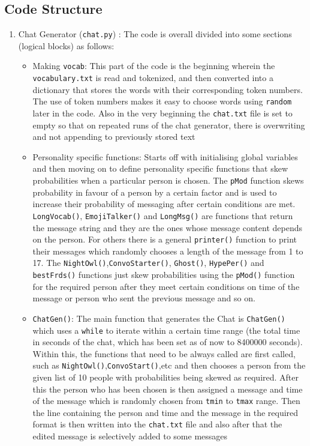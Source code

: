 \documentclass[12pt]{extarticle}
\begin{document}

\subsection{Code Structure}
\begin{enumerate}
    \item Chat Generator (\texttt{chat.py}) \cite{site1}: The code is overall divided into some sections (logical blocks) as follows:
    \begin{itemize}
        \item Making \texttt{vocab}: This part of the code is the beginning wherein the \texttt{vocabulary.txt} is read and tokenized, and then converted into a dictionary that stores the words with their corresponding token numbers. The use of token numbers makes it easy to choose words using \texttt{random} later in the code. Also in the very beginning the \texttt{chat.txt} file is set to empty so that on repeated runs of the chat generator, there is overwriting and not appending to previously stored text
        \item Personality specific functions: Starts off with initialising global variables and then moving on to define personality specific functions that skew probabilities when a particular person is chosen. The \texttt{pMod} function skews probability in favour of a person by a certain factor and is used to increase their probability of messaging after certain conditions are met. \texttt{LongVocab()}, \texttt{EmojiTalker()} and \texttt{LongMsg()} are functions that return the message string and they are the ones whose message content depends on the person. For others there is a general \texttt{printer()} function to print their messages which randomly chooses a length of the message from 1 to 17. The \texttt{NightOwl()},\texttt{ConvoStarter()}, \texttt{Ghost()}, \texttt{HypePer()} and \texttt{bestFrds()} functions just skew probabilities using the \texttt{pMod()} function for the required person after they meet certain conditions on time of the message or person who sent the previous message and so on. 
        \item \texttt{ChatGen()}: The main function that generates the Chat is \texttt{ChatGen()} which uses a \texttt{while} to iterate within a certain time range (the total time in seconds of the chat, which has been set as of now to 8400000 seconds). Within this, the functions that need to be always called are first called, such as \texttt{NightOwl()},\texttt{ConvoStart()},etc and then chooses a person from the given list of 10 people with probabilities being skewed as required. After this the person who has been chosen is then assigned a message and time of the message which is randomly chosen from \texttt{tmin} to \texttt{tmax} range. Then the line containing the person and time and the message in the required format is then written into the \texttt{chat.txt} file and also after that the edited message is selectively added to some messages

\end{itemize}
\end{enumerate}
\end{document}
